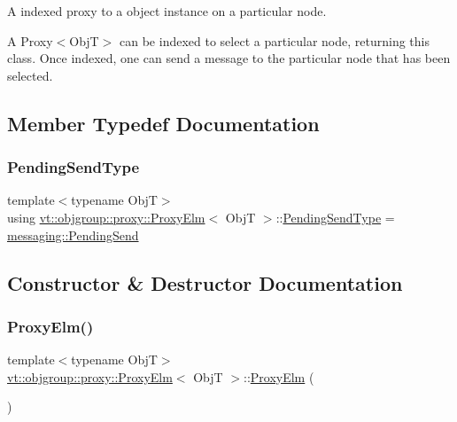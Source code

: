 A indexed proxy to a object instance on a particular node. 

A {\ttfamily Proxy$<$\+Obj\+T$>$} can be indexed to select a particular node, returning this class. Once indexed, one can send a message to the particular node that has been selected. 

\subsection{Member Typedef Documentation}
\mbox{\label{structvt_1_1objgroup_1_1proxy_1_1_proxy_elm_ab0f40d6a0191c974a4f4dd9dec0fc02f}} 
\subsubsection{\texorpdfstring{Pending\+Send\+Type}{PendingSendType}}
{\footnotesize\ttfamily template$<$typename ObjT$>$ \\
using \hyperlink{structvt_1_1objgroup_1_1proxy_1_1_proxy_elm}{vt\+::objgroup\+::proxy\+::\+Proxy\+Elm}$<$ ObjT $>$\+::\hyperlink{structvt_1_1objgroup_1_1proxy_1_1_proxy_elm_ab0f40d6a0191c974a4f4dd9dec0fc02f}{Pending\+Send\+Type} =  \hyperlink{structvt_1_1messaging_1_1_pending_send}{messaging\+::\+Pending\+Send}}



\subsection{Constructor \& Destructor Documentation}
\mbox{\label{structvt_1_1objgroup_1_1proxy_1_1_proxy_elm_ad610547c98659b9d34a6dca416a4d319}} 
\subsubsection{\texorpdfstring{Proxy\+Elm()}{ProxyElm()}\hspace{0.1cm}{\footnotesize\ttfamily [1/4]}}
{\footnotesize\ttfamily template$<$typename ObjT$>$ \\
\hyperlink{structvt_1_1objgroup_1_1proxy_1_1_proxy_elm}{vt\+::objgroup\+::proxy\+::\+Proxy\+Elm}$<$ ObjT $>$\+::\hyperlink{structvt_1_1objgroup_1_1proxy_1_1_proxy_elm}{Proxy\+Elm} (\begin{DoxyParamCaption}{ }\end{DoxyParamCaption})\hspace{0.3cm}{\ttfamily [default]}}

